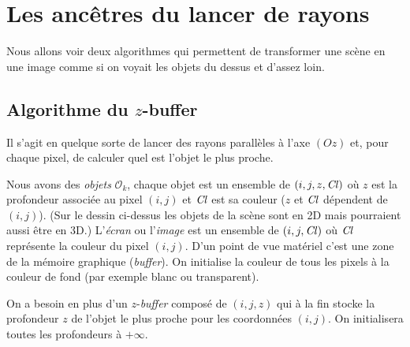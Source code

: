 \documentclass[11pt,class=report,crop=false]{standalone}
\begin{document}
\newcommand{\Cl}{\operatorname{\it Cl}}


%
%
%





\section{Les ancêtres du lancer de rayons}

Nous allons voir deux algorithmes qui permettent de transformer une scène en une image comme si on voyait les objets du dessus et d'assez loin.

\subsection{Algorithme du $z$-buffer}


Il s'agit en quelque sorte de lancer des rayons parallèles à l'axe $(Oz)$ et, pour chaque pixel, de calculer quel est l'objet le plus proche.


Nous avons des \emph{objets} $\mathcal{O}_k$, chaque objet est un ensemble de $(i,j,z,\Cl)$ où $z$ est la profondeur associée au pixel $(i,j)$ et $\Cl$ est sa couleur ($z$ et $\Cl$ dépendent de $(i,j)$).
(Sur le dessin ci-dessus les objets de la scène sont en 2D mais pourraient aussi être en 3D.)
L'\emph{écran} ou l'\emph{image} est un ensemble de $(i,j,\Cl)$ où $\Cl$ représente la couleur du pixel $(i,j)$. D'un point de vue matériel c'est une zone de la mémoire graphique (\emph{buffer}). On initialise la couleur de tous les pixels à la couleur de fond (par exemple blanc ou transparent).

On a besoin en plus d'un $z$-\emph{buffer} composé de $(i,j,z)$ qui à la fin stocke la profondeur $z$ de l'objet le plus proche pour les coordonnées $(i,j)$.
On initialisera toutes les profondeurs à $+\infty$.
\end{document}

